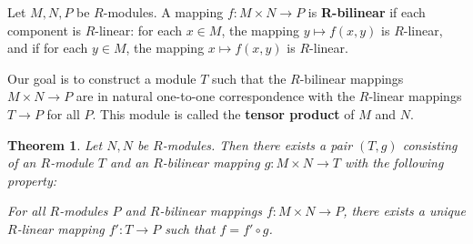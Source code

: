 \documentclass[11pt]{article}
\newtheorem{theorem}{Theorem}
\begin{document}
Let $M, N, P$ be $R$-modules. A mapping $f : M \times N \to P$ is \textbf{R-bilinear} if each component is $R$-linear: for each $x \in M$, the mapping $y \mapsto f(x, y)$ is $R$-linear, and if for each $y \in M$, the mapping $x \mapsto f(x, y)$ is $R$-linear.

Our goal is to construct a module $T$ such that the $R$-bilinear mappings $M \times N \to P$ are in natural one-to-one correspondence with the $R$-linear mappings $T \to P$ for all $P$. This module is called the \textbf{tensor product} of $M$ and $N$.

\begin{adjustwidth}{0.5cm}{}
  \begin{theorem}
    Let $N, N$ be $R$-modules. Then there exists a pair $(T, g)$ consisting of an $R$-module $T$ and an $R$-bilinear mapping $g : M \times N \to T$ with the following property:

    For all $R$-modules $P$ and $R$-bilinear mappings $f : M \times N \to P$, there exists a unique $R$-linear mapping $f' : T \to P$ such that $f = f' \circ g$. 


\end{theorem}
\end{adjustwidth}
\end{document}
